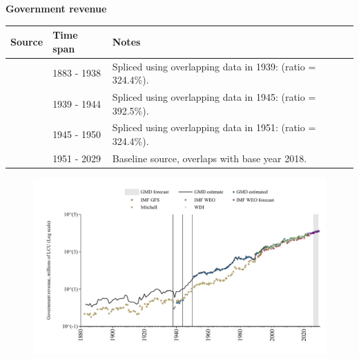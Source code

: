 \documentclass[12pt,a4paper,landscape]{article}
\begin{document}
\begin{adjustbox}{max totalsize={\paperwidth}{\paperheight},center}
\begin{minipage}[t][\textheight][t]{\textwidth}
\vspace*{0.5cm}
{}
\begin{center}
{\Large\bfseries Government revenue}
\end{center}
\vspace{0.5cm}
\begin{table}[H]
\centering
\small
\begin{tabular}{|l|l|l|}
\hline
\textbf{Source} & \textbf{Time span} & \textbf{Notes} \\
\hline
\rowcolor{white}\cite{Mitchell}& 1883 - 1938 &Spliced using overlapping data in 1939: (ratio = 324.4\%). \\
\rowcolor{lightgray}\cite{GMD_estimated}& 1939 - 1944 &Spliced using overlapping data in 1945: (ratio = 392.5\%). \\
\rowcolor{white}\cite{Mitchell}& 1945 - 1950 &Spliced using overlapping data in 1951: (ratio = 324.4\%). \\
\rowcolor{lightgray}\cite{GMD_estimated}& 1951 - 2029 &Baseline source, overlaps with base year 2018. \\
\hline
\end{tabular}
\end{table}
\begin{figure}[H]
\centering
\includegraphics[width=\textwidth,height=0.6\textheight,keepaspectratio]{graphs/SLV_govrev.pdf}
\end{figure}
\end{minipage}
\end{adjustbox}
\end{document}
